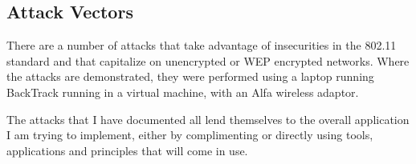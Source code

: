 \clearpage
\subsection{Attack Vectors}
\label{sec:attacks}
There are a number of attacks that take advantage of insecurities in the 802.11 standard and that capitalize on unencrypted or WEP encrypted networks.  Where the attacks are demonstrated, they were performed using a laptop running BackTrack running in a virtual machine, with an Alfa wireless adaptor.

The attacks that I have documented all lend themselves to the overall application I am trying to implement, either by complimenting or directly using tools, applications and principles that will come in use.




